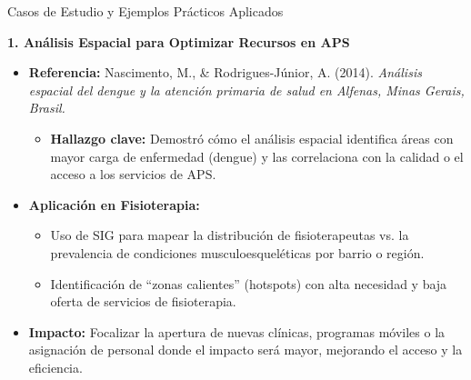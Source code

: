 \documentclass[aspectratio=169]{beamer}
\begin{document}
\begin{frame}{Casos de Estudio y Ejemplos Prácticos Aplicados}


\textbf{1. Análisis Espacial para Optimizar Recursos en APS}
\begin{itemize}
  \item \textbf{Referencia:} Nascimento, M., \& Rodrigues-Júnior, A. (2014). \textit{Análisis espacial del dengue y la atención primaria de salud en Alfenas, Minas Gerais, Brasil.}
  \begin{itemize}
    \item \textbf{Hallazgo clave:} Demostró cómo el análisis espacial identifica áreas con mayor carga de enfermedad (dengue) y las correlaciona con la calidad o el acceso a los servicios de APS.
  \end{itemize}
  \item \textbf{Aplicación en Fisioterapia:}
  \begin{itemize}
    \item Uso de SIG para mapear la distribución de fisioterapeutas vs. la prevalencia de condiciones musculoesqueléticas por barrio o región.
    \item Identificación de ``zonas calientes'' (hotspots) con alta necesidad y baja oferta de servicios de fisioterapia.
  \end{itemize}
  \item \textbf{Impacto:} Focalizar la apertura de nuevas clínicas, programas móviles o la asignación de personal donde el impacto será mayor, mejorando el acceso y la eficiencia.
\end{itemize}
\end{frame}
\end{document}
